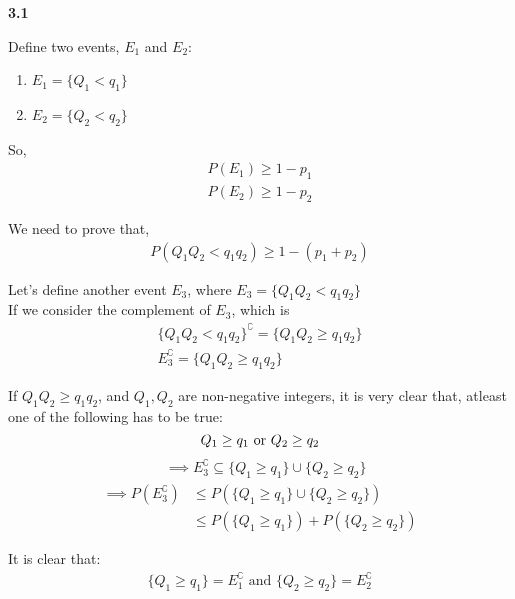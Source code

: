 \begin{tcolorbox}[breakable]
	\begin{sol}

		\textbf{3.1}

		Define two events, $E_1$ and $E_2$:
		\begin{enumerate}
			\item $E_1=\{Q_1<q_1\}$
			\item $E_2=\{Q_2<q_2\}$
		\end{enumerate}

		So,
		\begin{align}
			P(E_1)\geq 1-p_1 \\
			P(E_2)\geq 1-p_2
		\end{align}

		We need to prove that,
		\begin{align}
			P(Q_1Q_2 < q_1q_2) \geq 1 - (p_1 + p_2)
		\end{align}

		Let's define another event $E_3$, where $E_3=\{Q_1Q_2 <
			q_1q_2\}$\\ If we consider the complement of $E_3$, which is
		\begin{align}
			\{Q_1Q_2 < q_1q_2\}^\complement=\{Q_1Q_2 \geq q_1q_2\} \\
			E_3^\complement=\{Q_1Q_2 \geq q_1q_2\}
		\end{align}

		If $Q_1Q_2 \geq q_1q_2$, and $Q_1,Q_2$ are non-negative
		integers, it is very clear that, atleast one of the following
		has to be true: \begin{equation*}
			Q_1\geq q_1 \text{ or }Q_2\geq q_2 \\
		\end{equation*}
		\begin{align}
			 & \implies E_3^\complement \subseteq \{Q_1\geq q_1\}\cup\{Q_2\geq q_2\}
		\end{align}
		\begin{align}
			\implies P(E_3^\complement) & \leq P\left(\{Q_1\geq q_1\}\cup\{Q_2\geq q_2\} \right) \\
			                            & \leq P(\{Q_1\geq q_1\})+P(\{Q_2\geq q_2\} )
		\end{align}

		It is clear that:
		\begin{align}
			\{Q_1\geq q_1\} = E_1^\complement \text{ and } \{Q_2\geq q_2\} = E_2^\complement
		\end{align}


\end{sol}
\end{tcolorbox}
